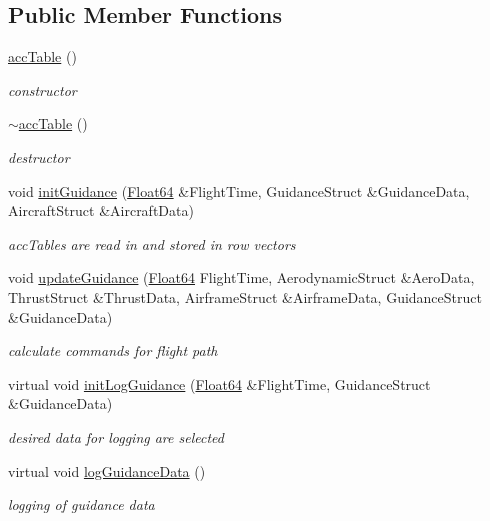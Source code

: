 \subsection*{Public Member Functions}
\begin{DoxyCompactItemize}
\item 
\hyperlink{classacc_table_a9f80e800ef73785c02c9aafa9a063c23}{acc\+Table} ()
\begin{DoxyCompactList}\small\item\em constructor \end{DoxyCompactList}\item 
\hyperlink{classacc_table_a92eab1c773e7d0c4bf3408a8a85ed354}{$\sim$acc\+Table} ()
\begin{DoxyCompactList}\small\item\em destructor \end{DoxyCompactList}\item 
void \hyperlink{classacc_table_ad477c8d63acae0be3f974b1a90b43e58}{init\+Guidance} (\hyperlink{group___tools_ga3f1431cb9f76da10f59246d1d743dc2c}{Float64} \&Flight\+Time, Guidance\+Struct \&Guidance\+Data, Aircraft\+Struct \&Aircraft\+Data)
\begin{DoxyCompactList}\small\item\em acc\+Tables are read in and stored in row vectors \end{DoxyCompactList}\item 
void \hyperlink{classacc_table_a60a9fdb7b041cd5aae020c4a5d252fba}{update\+Guidance} (\hyperlink{group___tools_ga3f1431cb9f76da10f59246d1d743dc2c}{Float64} Flight\+Time, Aerodynamic\+Struct \&Aero\+Data, Thrust\+Struct \&Thrust\+Data, Airframe\+Struct \&Airframe\+Data, Guidance\+Struct \&Guidance\+Data)
\begin{DoxyCompactList}\small\item\em calculate commands for flight path \end{DoxyCompactList}\item 
virtual void \hyperlink{classacc_table_a372235fd8a3d8090c3630b6c79087176}{init\+Log\+Guidance} (\hyperlink{group___tools_ga3f1431cb9f76da10f59246d1d743dc2c}{Float64} \&Flight\+Time, Guidance\+Struct \&Guidance\+Data)
\begin{DoxyCompactList}\small\item\em desired data for logging are selected \end{DoxyCompactList}\item 
virtual void \hyperlink{classacc_table_ace4665dcb6e791bbd30ba0f0abb79461}{log\+Guidance\+Data} ()
\begin{DoxyCompactList}\small\item\em logging of guidance data \end{DoxyCompactList}\end{DoxyCompactItemize}


